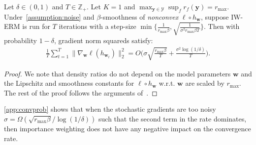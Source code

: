 \begin{theorem}\label{app:convprob} Let $\delta \in (0,1)$ and $T\in\mathbb{Z}_+$. Let $K=1$ and $\max_{\boldsymbol{y}\in\mathcal{Y}}\sup_f r_f(\boldsymbol{y})=r_{\max}$.
Under~\cref{assumption:noise} and $\beta$-smoothness of {\it nonconvex} $\ell\circ h_{\boldsymbol{w}}$, suppose IW-ERM is run for $T$ iterations with a step-size $\min\Big\{\frac{1}{r_{\max}\beta},\sqrt{\frac{1}{\sigma^2r_{\max}\beta T}}\Big\}$. Then with probability $1-\delta$, gradient norm squareds satisfy: 
\begin{align}
\frac{1}{T}\sum_{t=1}^T\|\nabla_{\boldsymbol{w}}\ell(h_{\boldsymbol{w}_t})\|_2^2=O\Big(\sigma\sqrt{\frac{r_{\max}\beta}{T}}+\frac{\sigma^2\log(1/\delta)}{T}\Big).  
\end{align}
\end{theorem}

\begin{proof}
We note that density ratios do not depend on the model parameters $\boldsymbol{w}$ and the Lipschitz and smoothness constants for $\ell\circ h_{\boldsymbol{w}}$ w.r.t. $\boldsymbol{w}$ are scaled by $r_{\max}$. The rest of the proof follows the arguments of~\citep[Theorem 4.1]{liu2023high}.
\end{proof} 


\cref{app:convprob} shows that when the stochastic gradients are too noisy $\sigma=\Omega(\sqrt{r_{\max}\beta}/\log(1/\delta))$ such that the second term in the rate dominates, then importance weighting does not have any negative impact on the convergence rate.
